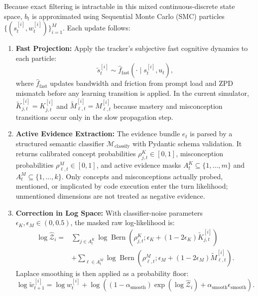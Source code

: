 \documentclass[11pt,a4paper]{report}
\begin{document}
Because exact filtering is intractable in this mixed continuous-discrete state space, $b_t$ is approximated using Sequential Monte Carlo (SMC) particles $\{(s_t^{[i]},w_t^{[i]})\}_{i=1}^M$. Each update follows:
\begin{enumerate}
    \item \textbf{Fast Projection:} Apply the tracker's subjective fast cognitive dynamics to each particle:
    \begin{equation}
        \tilde{s}_{t}^{[i]} \sim \hat{f}_{\text{fast}}(\cdot \mid s_t^{[i]},u_t),
    \end{equation}
    where $\hat{f}_{\text{fast}}$ updates bandwidth and friction from prompt load and ZPD mismatch before any learning transition is applied. In the current simulator, $\tilde{K}_{j,t}^{[i]}=K_{j,t}^{[i]}$ and $\tilde{M}_{\ell,t}^{[i]}=M_{\ell,t}^{[i]}$ because mastery and misconception transitions occur only in the slow propagation step.

    \item \textbf{Active Evidence Extraction:} The evidence bundle $e_t$ is parsed by a structured semantic classifier $\mathcal{M}_{\text{classify}}$ with Pydantic schema validation. It returns calibrated concept probabilities $\rho^K_{j,t}\in[0,1]$, misconception probabilities $\rho^M_{\ell,t}\in[0,1]$, and active evidence masks $A_t^K\subseteq\{1,\dots,m\}$ and $A_t^M\subseteq\{1,\dots,k\}$. Only concepts and misconceptions actually probed, mentioned, or implicated by code execution enter the turn likelihood; unmentioned dimensions are not treated as negative evidence.

    \item \textbf{Correction in Log Space:} With classifier-noise parameters $\epsilon_K,\epsilon_M\in(0,0.5)$, the masked raw log-likelihood is:
    \begin{equation}
    \begin{aligned}
        \log \hat{\mathcal{Z}}_i
        ={}& \sum_{j\in A_t^K}
        \log \operatorname{Bern}\left(
            \rho^K_{j,t};
            \epsilon_K+(1-2\epsilon_K)\tilde{K}_{j,t}^{[i]}
        \right) \\
        &+
        \sum_{\ell\in A_t^M}
        \log \operatorname{Bern}\left(
            \rho^M_{\ell,t};
            \epsilon_M+(1-2\epsilon_M)\tilde{M}_{\ell,t}^{[i]}
        \right).
    \end{aligned}
    \end{equation}
    Laplace smoothing is then applied as a probability floor:
    \begin{equation}
        \log \tilde{w}_{t+1}^{[i]}
        =
        \log w_t^{[i]}
        +
        \log\left(
        (1-\alpha_{\text{smooth}})\exp(\log \hat{\mathcal{Z}}_i)
        + \alpha_{\text{smooth}}\epsilon_{\text{smooth}}
        \right).
    \end{equation}


\end{enumerate}
\end{document}
